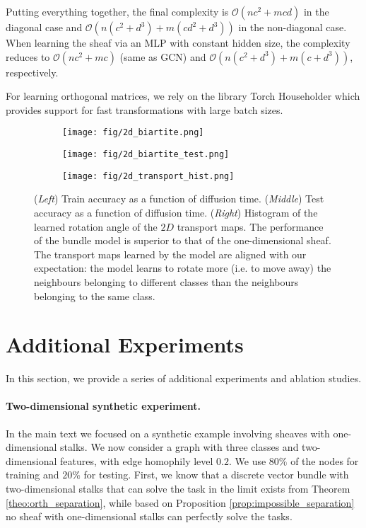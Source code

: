 \documentclass{article}
\def\gO{{\mathcal{O}}}
\begin{document}
Putting everything together, the final complexity is $\gO(nc^2 + mcd)$ in the diagonal case and $\gO\left(n(c^2 + d^3) + m(cd^2 + d^3)\right)$ in the non-diagonal case. When learning the sheaf via an MLP with constant hidden size, the complexity reduces to $\gO(nc^2 + mc)$ (same as GCN) and $\gO\left(n(c^2 + d^3) + m(c + d^3)\right)$, respectively. 

For learning orthogonal matrices, we rely on the library Torch Householder \citep{obukhov2021torchhouseholder} which provides support for fast transformations with large batch sizes. 
\begin{figure*}[t]
    \begin{subfigure}[b]{0.32\columnwidth}
        \centering
        \texttt{[image: fig/2d\_biartite.png]}
    \end{subfigure}
    \hfill
    \begin{subfigure}[b]{0.32\columnwidth}
        \centering
        \texttt{[image: fig/2d\_biartite\_test.png]}
    \end{subfigure}
    \hfill
    \begin{subfigure}[b]{0.32\columnwidth}
        \centering
        \texttt{[image: fig/2d\_transport\_hist.png]}
    \end{subfigure}
    \caption{(\textit{Left}) Train accuracy as a function of diffusion time. (\textit{Middle}) Test accuracy as a function of diffusion time. (\textit{Right}) Histogram of the learned rotation angle of the $2D$ transport maps. The performance of the bundle model is superior to that of the one-dimensional sheaf. The transport maps learned by the model are aligned with our expectation: the model learns to rotate more (i.e. to move away) the neighbours belonging to different classes than the neighbours belonging to the same class. }
    \label{fig:3d_synthetic}
\end{figure*}

\section{Additional Experiments}\label{app:extra_experiments}

In this section, we provide a series of additional experiments and ablation studies. 


\paragraph{Two-dimensional synthetic experiment.} In the main text we focused on a synthetic example involving sheaves with one-dimensional stalks. We now consider a graph with three classes and two-dimensional features, with edge homophily level $0.2$. We use $80\%$ of the nodes for training and $20\%$ for testing. First, we know that a discrete vector bundle with two-dimensional stalks that can solve the task in the limit exists from Theorem \ref{theo:orth_separation}, while based on Proposition \ref{prop:impossible_separation} no sheaf with one-dimensional stalks can perfectly solve the tasks. 
\end{document}
